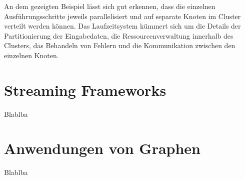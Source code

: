 An dem gezeigten Beispiel lässt sich gut erkennen, dass die einzelnen Ausführungsschritte jeweils parallelisiert und auf separate Knoten im Cluster verteilt werden können. Das Laufzeitsystem kümmert sich um die Details der Partitionierung der Eingabedaten, die Ressourcenverwaltung innerhalb des Clusters, das Behandeln von Fehlern und die Kommunikation zwischen den einzelnen Knoten. 
 

\section{Streaming Frameworks}
\label{section:streaming framworks}

Blablba

\section{Anwendungen von Graphen}
\label{section:anwendungen von graphen}

Blablba